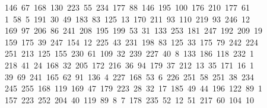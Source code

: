 \begin{tabbing}
\ 146\ 67\ 168\ 130\ 223\ 55\ 234\ 177\ 88\ 146\ 195\ 100\ 176\ 210\ 177\ 61\ \\[0pt]
\ 1\ 58\ 5\ 191\ 30\ 49\ 183\ 83\ 125\ 13\ 170\ 211\ 93\ 110\ 219\ 93\ 246\ 12\\[0pt]
\ 169\ 97\ 206\ 86\ 241\ 208\ 195\ 199\ 53\ 31\ 133\ 253\ 181\ 247\ 192\ 209\ 19\\[0pt]
\>\ 159\ 175\ 39\ 247\ 154\ 12\ 225\ 43\ 231\ 198\ 83\ 125\ 33\ 175\ 79\ 242\ 224\ \\[0pt]
\ 251\ 213\ 125\ 155\ 230\ 61\ 109\ 32\ 239\ 227\ 40\ 8\ 133\ 186\ 118\ 232\ 1\\[0pt]
\ 218\ 41\ 24\ 168\ 32\ 205\ 172\ 216\ 36\ 94\ 179\ 37\ 212\ 13\ 35\ 171\ 16\ 1\\[0pt]
\ 39\ 69\ 241\ 165\ 62\ 91\ 136\ 4\ 227\ 168\ 53\ 6\ 226\ 251\ 58\ 251\ 38\ 234\\[0pt]
\>\ 245\ 255\ 168\ 119\ 169\ 47\ 179\ 223\ 28\ 32\ 17\ 185\ 49\ 44\ 196\ 122\ 89\ 1\\[0pt]
\ 157\ 223\ 252\ 204\ 40\ 119\ 89\ 8\ 7\ 178\ 235\ 52\ 12\ 51\ 217\ 60\ 104\ 10\\[0pt]

\end{tabbing}
